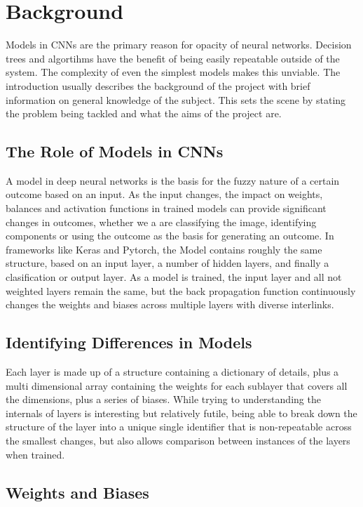 \section{Background}

Models in CNNs are the primary reason for opacity of neural networks. Decision
trees and algortihms have the benefit of being easily repeatable outside of the
system. The complexity of even the simplest models makes this unviable. 
The introduction usually describes the background of the project with brief information on general knowledge of the subject. This sets the scene by stating the problem being tackled and what the aims of the project are.

\subsection{The Role of Models in CNNs}
A model in deep neural networks is the basis for the fuzzy nature of a certain outcome based on an input. As the input changes, the impact on weights, balances and activation functions in trained models can provide significant changes in outcomes, whether we a are classifying the image, identifying components or using the outcome as the basis for generating an outcome. In frameworks like Keras and Pytorch, the Model contains roughly the same structure, based on an input layer, a number of hidden layers, and finally a clasification or output layer. As a model is trained, the input layer and all not weighted layers remain the same, but the back propagation function continuously changes the weights and biases across multiple layers with diverse interlinks.
\subsection{Identifying Differences in Models}
Each layer is made up of a structure containing a dictionary of details, plus a multi dimensional array containing the weights for each sublayer that covers all the dimensions, plus a series of biases. While trying to understanding the internals of layers is interesting but relatively futile, being able to break down the structure of the layer into a unique single identifier that is non-repeatable across the smallest changes, but also allows comparison between instances of the layers when trained.
\subsection{Weights and Biases}

